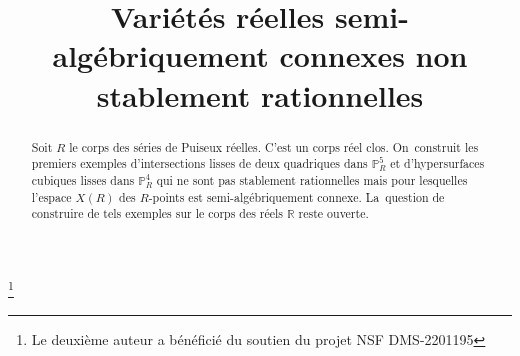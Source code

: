 \documentclass[JEP,XML,SOM,Unicode,francais,published]{cedram}
\theoremstyle{definition}
\begin{document}
\frontmatter
\title[Variétés réelles connexes non stablement rationnelles]{Variétés réelles semi-algébriquement connexes non stablement rationnelles}

\author[\initial{J.-L.} \lastname{Colliot-Thélène}]{ }
\address{Université Paris-Saclay, CNRS, Laboratoire de mathématiques d'Orsay,\\
91405, Orsay, France}

\author[\initial{A.} \lastname{Pirutka}]{ }
\address{Courant Institute of Mathematical Sciences, New York University,\\
New York 10012, U.S.A.}

\author[\initial{F.} \lastname{Scavia}]{\nobreakauthor {}}
\address{CNRS, Institut Galilée, Université Sorbonne Paris Nord,\\
99 avenue Jean-Baptiste Clément, 93430 Villetaneuse, France}

\thanks{Le deuxième auteur a bénéficié du soutien du projet NSF DMS-2201195}

\begin{abstract}
Soit $R$ le corps des séries de Puiseux réelles. C'est un corps réel clos. On~construit les premiers exemples d'intersections lisses de deux quadriques dans $\mathbb{P}_R^5$ et d'hypersurfaces cubiques lisses dans $\mathbb{P}_R^4$ qui ne sont pas stablement rationnelles mais pour lesquelles l'espace $X(R)$ des $R$-points est semi-algébriquement connexe. La~question de construire de tels exemples sur le corps des réels $\mathbb{R}$ reste ouverte.
\end{abstract}




\end{document}
